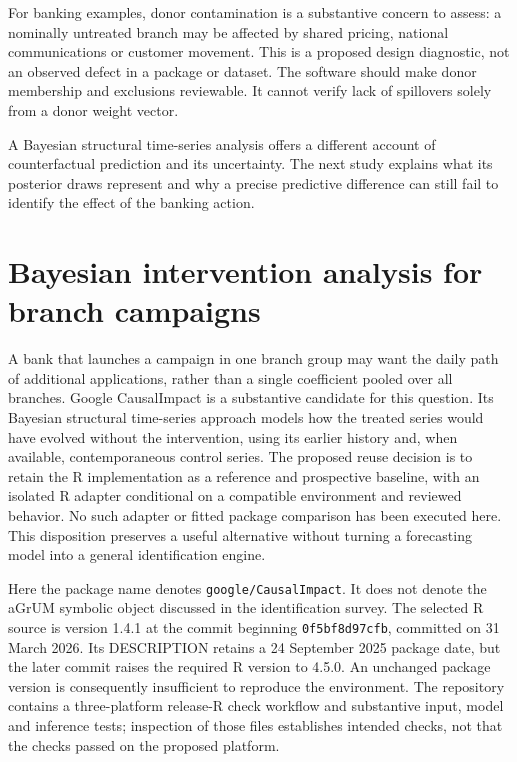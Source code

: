For banking examples, donor contamination is a substantive concern to assess:
a nominally untreated branch may be affected by shared pricing, national
communications or customer movement. This is a proposed design diagnostic,
not an observed defect in a package or dataset. The software should make donor
membership and exclusions reviewable. It cannot verify lack of spillovers
solely from a donor weight vector.

A Bayesian structural time-series analysis offers a different account of
counterfactual prediction and its uncertainty. The next study explains what
its posterior draws represent and why a precise predictive difference can
still fail to identify the effect of the banking action.



\section{Bayesian intervention analysis for branch campaigns}
\label{exec13:causalimpact-reuse}

A bank that launches a campaign in one branch group may want the daily path of
additional applications, rather than a single coefficient pooled over all
branches. Google CausalImpact is a substantive candidate for this question.
Its Bayesian structural time-series approach models how the treated series
would have evolved without the intervention, using its earlier history and,
when available, contemporaneous control series. The proposed reuse decision
is to retain the R implementation as a reference and prospective baseline,
with an isolated R adapter conditional on a compatible environment and
reviewed behavior. No such adapter or fitted package comparison has been
executed here. This disposition preserves a useful alternative without
turning a forecasting model into a general identification engine.
\citep{exec13_ci_reuse,exec13_ci_r}

Here the package name denotes \texttt{google/CausalImpact}. It does not denote
the aGrUM symbolic object discussed in the identification survey. The
selected R source is version 1.4.1 at the commit beginning
\texttt{0f5bf8d97cfb}, committed on 31 March 2026. Its DESCRIPTION retains a
24 September 2025 package date, but the later commit raises the required R
version to 4.5.0. An unchanged package version is consequently insufficient
to reproduce the environment. The repository contains a three-platform
release-R check workflow and substantive input, model and inference tests;
inspection of those files establishes intended checks, not that the checks
passed on the proposed platform. \citep{exec13_ci_r,exec13_ci_semantics}

